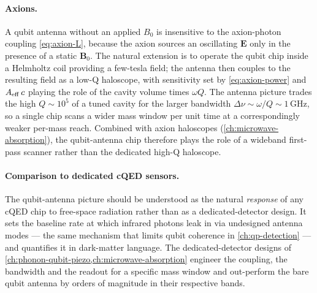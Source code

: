 \paragraph{Axions.}
A qubit antenna without an applied $B_0$ is insensitive to the
axion-photon coupling \cref{eq:axion-L}, because the axion
sources an oscillating $\bm E$ only in the presence of a static
$\bm B_0$. The natural extension is to operate the qubit chip
inside a Helmholtz coil providing a few-tesla field; the antenna
then couples to the resulting field as a low-Q haloscope, with
sensitivity set by \cref{eq:axion-power} and $A_{\rm eff}\,c$
playing the role of the cavity volume times $\omega Q$. The
antenna picture trades the high $Q\sim 10^5$ of a tuned cavity
for the larger bandwidth $\Delta\nu\sim\omega/Q\sim 1\,\text{GHz}$,
so a single chip scans a wider mass window per unit time at a
correspondingly weaker per-mass reach. Combined with axion
haloscopes (\cref{ch:microwave-absorption}), the qubit-antenna
chip therefore plays the role of a wideband first-pass scanner
rather than the dedicated high-Q haloscope.

\paragraph{Comparison to dedicated cQED sensors.}
The qubit-antenna picture should be understood as the natural
\emph{response} of any cQED chip to free-space radiation rather
than as a dedicated-detector design. It sets the baseline rate at
which infrared photons leak in via undesigned antenna modes ---
the same mechanism that limits qubit coherence in
\cref{ch:qp-detection} --- and quantifies it in dark-matter
language. The dedicated-detector designs of
\cref{ch:phonon-qubit-piezo,ch:microwave-absorption} engineer the
coupling, the bandwidth and the readout for a specific mass
window and out-perform the bare qubit antenna by orders of
magnitude in their respective bands.

